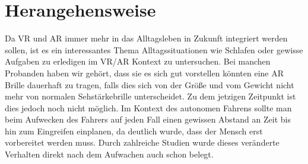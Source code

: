 \section{Herangehensweise}

Da VR und AR immer mehr in das Alltagsleben in Zukunft integriert werden sollen, ist es ein interessantes Thema Alltagssituationen wie Schlafen oder gewisse Aufgaben zu erledigen im VR/AR Kontext zu untersuchen. Bei manchen Probanden haben wir gehört, dass sie es sich gut vorstellen könnten eine AR Brille dauerhaft zu tragen, falls dies sich von der Größe und vom Gewicht nicht mehr von normalen Sehstärkebrille unterscheidet. Zu dem jetzigen Zeitpunkt ist dies jedoch noch nicht möglich.
Im Kontext des autonomen Fahrens sollte man beim Aufwecken des Fahrers auf jeden Fall einen gewissen Abstand an Zeit bis hin zum Eingreifen einplanen, da deutlich wurde, dass der Mensch erst vorbereitet werden muss. Durch zahlreiche Studien wurde dieses veränderte Verhalten direkt nach dem Aufwachen auch schon belegt.
